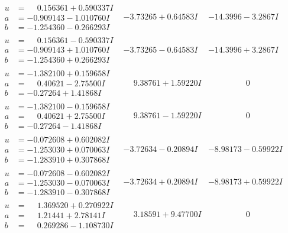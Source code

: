 \documentclass[1p]{elsarticle_modified}
\theoremstyle{definition}
\begin{document}
$$\begin{array}{c|c|c}
\begin{aligned}
u &= \phantom{-}0.156361 + 0.590337 I \\
a &= -0.909143 - 1.010760 I \\
b &= -1.254360 - 0.266293 I\end{aligned}
 & -3.73265 + 0.64583 I & -14.3996 - 3.2867 I \\ \hline\begin{aligned}
u &= \phantom{-}0.156361 - 0.590337 I \\
a &= -0.909143 + 1.010760 I \\
b &= -1.254360 + 0.266293 I\end{aligned}
 & -3.73265 - 0.64583 I & -14.3996 + 3.2867 I \\ \hline\begin{aligned}
u &= -1.382100 + 0.159658 I \\
a &= \phantom{-}0.40621 - 2.75500 I \\
b &= -0.27264 + 1.41868 I\end{aligned}
 & \phantom{-}9.38761 + 1.59220 I & \phantom{-0.000000 } 0 \\ \hline\begin{aligned}
u &= -1.382100 - 0.159658 I \\
a &= \phantom{-}0.40621 + 2.75500 I \\
b &= -0.27264 - 1.41868 I\end{aligned}
 & \phantom{-}9.38761 - 1.59220 I & \phantom{-0.000000 } 0 \\ \hline\begin{aligned}
u &= -0.072608 + 0.602082 I \\
a &= -1.253030 + 0.070063 I \\
b &= -1.283910 + 0.307868 I\end{aligned}
 & -3.72634 - 0.20894 I & -8.98173 - 0.59922 I \\ \hline\begin{aligned}
u &= -0.072608 - 0.602082 I \\
a &= -1.253030 - 0.070063 I \\
b &= -1.283910 - 0.307868 I\end{aligned}
 & -3.72634 + 0.20894 I & -8.98173 + 0.59922 I \\ \hline\begin{aligned}
u &= \phantom{-}1.369520 + 0.270922 I \\
a &= \phantom{-}1.21441 + 2.78141 I \\
b &= \phantom{-}0.269286 - 1.108730 I\end{aligned}
 & \phantom{-}3.18591 + 9.47700 I & \phantom{-0.000000 } 0\\

\end{array}$$
\end{document}
